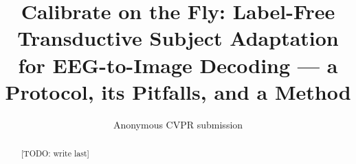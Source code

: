 \documentclass[10pt,twocolumn,letterpaper]{article}
\title{Calibrate on the Fly: Label-Free Transductive Subject Adaptation\\
for EEG-to-Image Decoding --- a Protocol, its Pitfalls, and a Method}
\author{Anonymous CVPR submission}
\newcommand{\todo}[1]{{\color{red}[TODO: #1]}}
\newcommand{\XX}{{\color{red}XX}}
\begin{document}
\maketitle

\begin{abstract}
\todo{write last}
\end{abstract}

\end{document}
